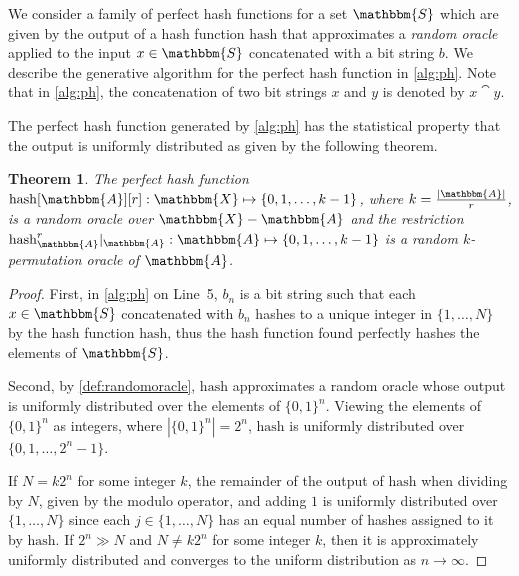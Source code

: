 \documentclass[hidelinks,11pt,final]{article}
\newcommand{\envnumstyle}{section}
\theoremstyle{plain}
\newtheorem{theorem}{Theorem}[\envnumstyle]
\begin{document}
We consider a family of perfect hash functions for a set $\mathbbm{S}$ which are given by the output of a hash function $\mathrm{hash}$ that approximates a \emph{random oracle} applied to the input $x \in \mathbbm{S}$ concatenated with a bit string $b$. We describe the generative algorithm for the perfect hash function in \cref{alg:ph}. Note that in \cref{alg:ph}, the concatenation of two bit strings $x$ and $y$ is denoted by $x \cat y$.

The perfect hash function generated by \cref{alg:ph} has the statistical property that the output is uniformly distributed as given by the following theorem.
\begin{theorem}
The perfect hash function $\mathrm{hash}[\mathbbm{A}][r] : \mathbbm{X} \mapsto \{0,1,\ldots,k-1\}$, where $k = \frac{|\mathbbm{A}|}{r}$, is a random oracle over $\mathbbm{X} - \mathbbm{A}$ and the restriction $\mathrm{hash}_\mathbbm{A}^r| _{\mathbbm{A}} : \mathbbm{A} \mapsto \{0,1,\ldots,k-1\}$ is a random $k$-permutation oracle of $\mathbbm{A}$.
\end{theorem}
\begin{proof}
First, in \cref{alg:ph} on Line~5, $b_n$ is a bit string such that each $x \in \mathbbm{S}$ concatenated with $b_n$ hashes to a unique integer in $\{1,\ldots,N\}$ by the hash function $\mathrm{hash}$, thus the hash function found perfectly hashes the elements of $\mathbbm{S}$. 

Second, by \cref{def:randomoracle}, $\mathrm{hash}$ approximates a random oracle whose output is uniformly distributed over the elements of $\{0,1\}^{n}$. Viewing the elements of $\{0,1\}^{n}$ as integers, where $|\{0,1\}^n| = 2^n$, $\mathrm{hash}$ is uniformly distributed over $\{0,1,\ldots,2^n-1\}$.

If $N = k 2^n$ for some integer $k$, the remainder of the output of $\mathrm{hash}$ when dividing by $N$, given by the modulo operator, and adding $1$ is uniformly distributed over $\{1,\ldots,N\}$ since each $j \in \{1,\ldots,N\}$ has an equal number of hashes assigned to it by $\mathrm{hash}$. If $2^n \gg N$ and $N \neq k 2^n$ for some integer $k$, then it is approximately uniformly distributed and converges to the uniform distribution as $n \to \infty$.
\end{proof}
\end{document}
